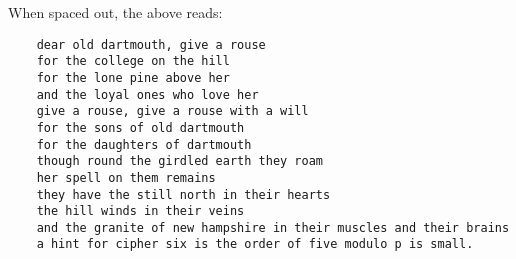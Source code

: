 \begin{Answer}
  \newpage
  \noindent
  When spaced out, the above reads:

  \begin{Verbatim}
    dear old dartmouth, give a rouse
    for the college on the hill
    for the lone pine above her
    and the loyal ones who love her
    give a rouse, give a rouse with a will
    for the sons of old dartmouth
    for the daughters of dartmouth
    though round the girdled earth they roam
    her spell on them remains
    they have the still north in their hearts
    the hill winds in their veins
    and the granite of new hampshire in their muscles and their brains
    a hint for cipher six is the order of five modulo p is small.
  \end{Verbatim}
\end{Answer}
